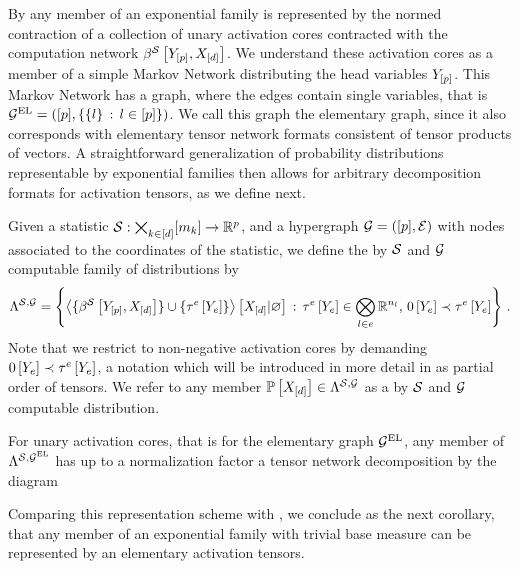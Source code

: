 By  any member of an exponential family is represented by the normed contraction of a collection of unary activation cores contracted with the computation network $\beta^{\mathcal{S}}\left[Y_{[p]},X_{[d]}\right]$.
We understand these activation cores as a member of a simple Markov Network distributing the head variables $Y_{[p]}$.
This Markov Network has a graph, where the edges contain single variables, that is $\mathcal{G}^{\mathrm{EL}}=([p],\{\{l\} \, : \, l\in[p]\})$.
We call this graph the elementary graph, since it also corresponds with elementary tensor network formats consistent of tensor products of vectors.
A straightforward generalization of probability distributions representable by exponential families then allows for arbitrary decomposition formats for activation tensors, as we define next.

\begin{definition}
    \label{def:realizableStatDistributions}
    Given a statistic $\mathcal{S} : \bigtimes_{k\in[d]}[m_{k}] \rightarrow \mathbb{R}^{p}$, and a hypergraph $\mathcal{G}=([p],\mathcal{E})$ with nodes associated to the coordinates of the statistic, we define the by $\mathcal{S}$ and $\mathcal{G}$ computable family of distributions by
    \begin{align*}
        \Lambda^{\mathcal{S},\mathcal{G}}
        = \left\{ \left\langle \{\beta^{\mathcal{S}}\left[Y_{[p]},X_{[d]}\right]\} \cup \{\tau^{e}\left[Y_{e}\right]\}\right\rangle \left[ X_{[d]} | \varnothing \right]  \, : \,\tau^{e}\left[Y_{e}\right]\in\bigotimes_{l\in e}\mathbb{R}^{n_{l}}, \, 0\left[Y_{e}\right]\prec\tau^{e}\left[Y_{e}\right] \right\} \, .
    \end{align*}
    Note that we restrict to non-negative activation cores by demanding $0\left[Y_{e}\right]\prec\tau^{e}\left[Y_{e}\right]$, a notation which will be introduced in more detail in  as partial order of tensors.
    We refer to any member $\mathbb{P}\left[X_{[d]}\right]\in\Lambda^{\mathcal{S},\mathcal{G}}$ as a by $\mathcal{S}$ and $\mathcal{G}$ computable distribution.
\end{definition}

For unary activation cores, that is for the elementary graph $\mathcal{G}^{\mathrm{EL}}$, any member of $\Lambda^{\mathcal{S},\mathcal{G}^{\mathrm{EL}}}$ has up to a normalization factor a tensor network decomposition by the diagram
\begin{center}
    
\end{center}
Comparing this representation scheme with , we conclude as the next corollary, that any member of an exponential family with trivial base measure can be represented by an elementary activation tensors.


